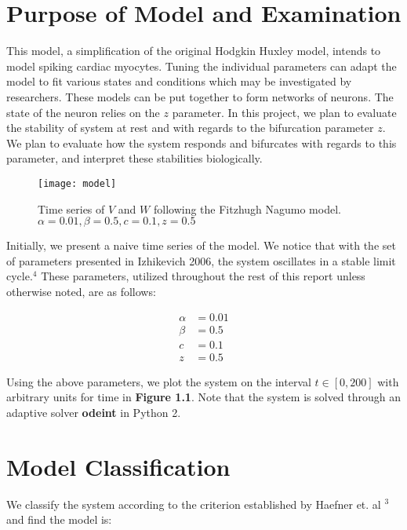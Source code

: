 \documentclass[11pt]{report}
\begin{document}
\section{Purpose of Model and Examination}

This model, a simplification of the original Hodgkin Huxley model, intends to model spiking cardiac myocytes. Tuning the individual parameters can adapt the model to fit various states and conditions which may be investigated by researchers. These models can be put together to form networks of neurons. The state of the neuron relies on the $z$ parameter. 
In this project, we plan to evaluate the stability of system at rest and with regards to the bifurcation parameter $z$. We plan to evaluate how the system responds and bifurcates with regards to this parameter, and interpret these stabilities biologically. 


\begin{figure}[!ht]
  \caption{Time series of $V$ and $W$ following the Fitzhugh Nagumo model. $\alpha = 0.01, \beta = 0.5,c = 0.1,z = 0.5$}
  \centering
    \texttt{[image: model]}
\end{figure}

Initially, we present a naive time series of the model. We notice that with the set of parameters presented in Izhikevich 2006, the system oscillates in a stable limit cycle.$^4$ These parameters, utilized throughout the rest of this report unless otherwise noted, are as follows:

$$ \begin{aligned} \alpha &= 0.01 \\ \beta &= 0.5 \\ c &= 0.1 \\ z &= 0.5 \end{aligned} $$

Using the above parameters, we plot the system on the interval $t \in [0,200]$ with arbitrary units for time in \textbf{Figure 1.1}. Note that the system is solved through an adaptive solver \textbf{odeint} in Python 2. 


\section{Model Classification} %
\label{sub:model_classification}

We classify the system according to the criterion established by Haefner et. al $^{3}$ and find the model is:
\end{document}
